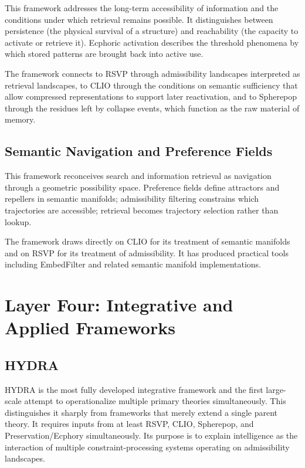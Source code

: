 \documentclass[12pt, twoside]{article}
\begin{document}
This framework addresses the long-term accessibility of information and the
conditions under which retrieval remains possible. It distinguishes between
persistence (the physical survival of a structure) and reachability (the
capacity to activate or retrieve it). Ecphoric activation describes the
threshold phenomena by which stored patterns are brought back into active
use.

The framework connects to RSVP through admissibility landscapes interpreted
as retrieval landscapes, to CLIO through the conditions on semantic
sufficiency that allow compressed representations to support later
reactivation, and to Spherepop through the residues left by collapse events,
which function as the raw material of memory.

\subsection{Semantic Navigation and Preference Fields}

This framework reconceives search and information retrieval as navigation
through a geometric possibility space. Preference fields define attractors
and repellers in semantic manifolds; admissibility filtering constrains which
trajectories are accessible; retrieval becomes trajectory selection rather
than lookup.

The framework draws directly on CLIO for its treatment of semantic manifolds
and on RSVP for its treatment of admissibility. It has produced practical
tools including EmbedFilter and related semantic manifold implementations.

\section{Layer Four: Integrative and Applied Frameworks}
\label{sec:integrative}

\subsection{HYDRA}

HYDRA is the most fully developed integrative framework and the first
large-scale attempt to operationalize multiple primary theories
simultaneously. This distinguishes it sharply from frameworks that merely
extend a single parent theory. It requires inputs
from at least RSVP, CLIO, Spherepop, and Preservation/Ecphory simultaneously.
Its purpose is to explain intelligence as the interaction of multiple
constraint-processing systems operating on admissibility landscapes.
\end{document}
